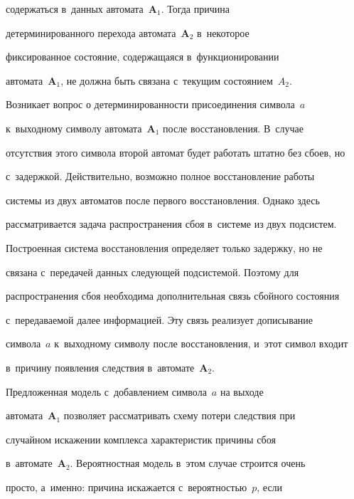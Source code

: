 содержаться в~данных автомата~\textbf{A}$_1$. Тогда причина 


детерминированного перехода автомата~\textbf{A}$_2$ в~некоторое 


фиксированное со\-сто\-яние, со\-дер\-жа\-ща\-яся в~функционировании 


автомата~\textbf{A}$_1$, не должна быть связана с~текущим со\-сто\-яни\-ем~$A_2$.   


  


  Возникает вопрос о детерминированности присоединения символа~$a$ 


к~выходному символу автомата~\textbf{A}$_1$ после вос\-ста\-нов\-ле\-ния. В~случае 


отсутствия этого символа второй автомат будет работать штат\-но без сбоев, но 


с~за\-держ\-кой. Действительно, воз\-мож\-но пол\-ное вос\-ста\-нов\-ле\-ние работы  


сис\-те\-мы из двух автоматов после первого вос\-ста\-нов\-ле\-ния. Однако здесь 


рас\-смат\-ри\-ва\-ет\-ся задача распространения сбоя в~сис\-те\-ме из двух под\-сис\-тем. 


  


  Построенная система восстановления определяет только за\-держ\-ку, но не 


связана с~передачей данных сле\-ду\-ющей под\-сис\-те\-мой. Поэтому для 


рас\-про\-стра\-не\-ния сбоя необходима дополнительная связь сбойного со\-сто\-яния  


с~пе\-ре\-да\-ва\-емой далее информацией. Эту связь реализует дописывание 


символа~$a$ к~выходному символу после восстановления, и~этот сим\-вол входит 


в~причину появления следствия в~автомате~\textbf{A}$_2$. 


  


  Предложенная модель с~добавлением символа~$a$ на выходе 


автомата~\textbf{A}$_1$ поз\-во\-ля\-ет рас\-смат\-ри\-вать схему потери следствия при 


случайном искажении комплекса характеристик причины сбоя 


в~автомате~\textbf{A}$_2$. Вероятностная модель в~этом случае строится очень  


прос\-то, а~именно: причина искажается с~ве\-ро\-ят\-ностью~$p$, если 


